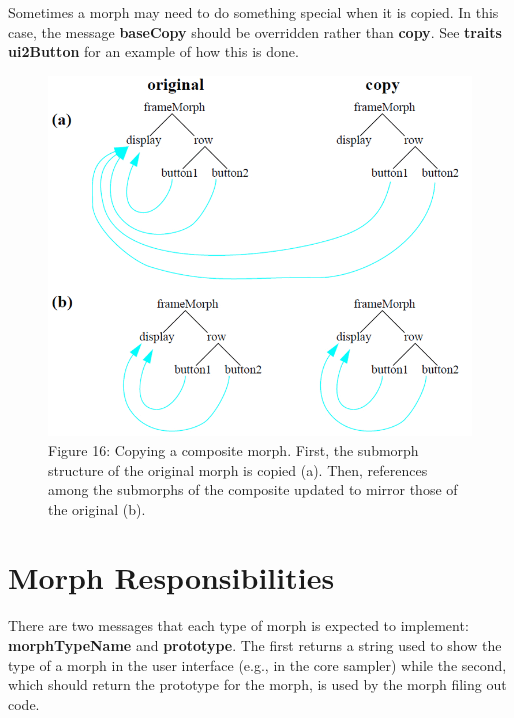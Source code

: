 \documentclass[letterpaper,10pt,english]{sphinxmanual}
\begin{document}
Sometimes a morph may need to do something special when it is copied. In this case, the message \textbf{baseCopy} should be overridden rather than \textbf{copy}. See \textbf{traits ui2Button} for an example of how this is done.
\begin{figure}[htbp]\begin{flushleft}
\capstart

\includegraphics{Figure16.png}
\caption{Figure 16: Copying a composite morph. First, the submorph structure of the original morph is copied (a). Then, references among the submorphs of the composite updated to mirror those of the original (b).}\end{flushleft}\end{figure}


\section{Morph Responsibilities}
\label{morphic:morph-responsibilities}
There are two messages that each type of morph is expected to implement: \textbf{morphTypeName} and \textbf{prototype}. The first returns a string used to show the type of a morph in the user interface (e.g., in the core sampler) while the second, which should return the prototype for the morph, is used by the morph filing out code.
\end{document}
